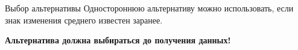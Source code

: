 \documentclass[9pt,pdf,utf8,hyperref={unicode},aspectratio=169]{beamer}
\begin{document}
\begin{frame}{Выбор альтернативы}
\large
Одностороннюю альтернативу можно использовать, если знак изменения среднего известен заранее.

\bigskip

\textbf{Альтернатива должна выбираться до получения данных!}
\end{frame}
\end{document}
